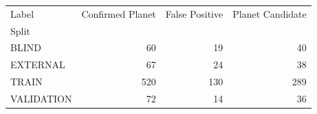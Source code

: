 \begin{tabular}{lrrr}
\toprule
Label & Confirmed Planet & False Positive & Planet Candidate \\
Split &  &  &  \\
\midrule
BLIND & 60 & 19 & 40 \\
EXTERNAL & 67 & 24 & 38 \\
TRAIN & 520 & 130 & 289 \\
VALIDATION & 72 & 14 & 36 \\
\bottomrule
\end{tabular}
